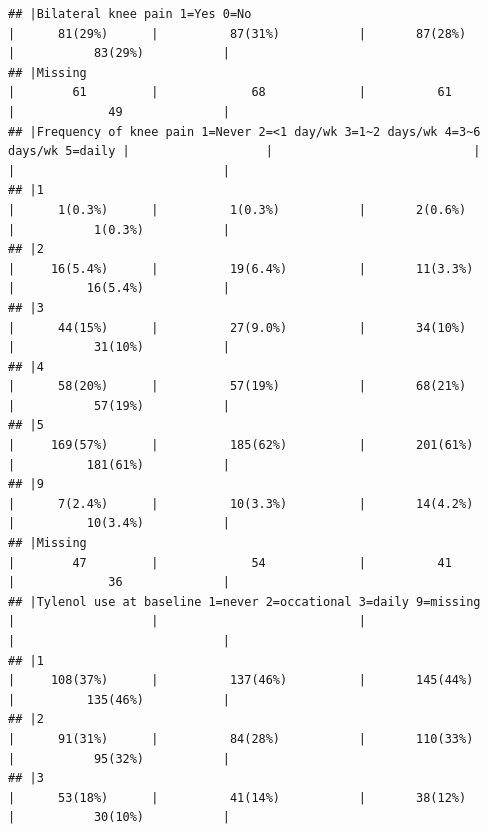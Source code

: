 \documentclass{article}
\begin{document}
\begin{verbatim}
## |Bilateral knee pain 1=Yes 0=No                                                 |      81(29%)      |          87(31%)           |       87(28%)        |           83(29%)           |
## |Missing                                                                        |        61         |             68             |          61          |             49              |
## |Frequency of knee pain 1=Never 2=<1 day/wk 3=1~2 days/wk 4=3~6 days/wk 5=daily |                   |                            |                      |                             |
## |1                                                                              |      1(0.3%)      |          1(0.3%)           |       2(0.6%)        |           1(0.3%)           |
## |2                                                                              |     16(5.4%)      |          19(6.4%)          |       11(3.3%)       |          16(5.4%)           |
## |3                                                                              |      44(15%)      |          27(9.0%)          |       34(10%)        |           31(10%)           |
## |4                                                                              |      58(20%)      |          57(19%)           |       68(21%)        |           57(19%)           |
## |5                                                                              |     169(57%)      |          185(62%)          |       201(61%)       |          181(61%)           |
## |9                                                                              |      7(2.4%)      |          10(3.3%)          |       14(4.2%)       |          10(3.4%)           |
## |Missing                                                                        |        47         |             54             |          41          |             36              |
## |Tylenol use at baseline 1=never 2=occational 3=daily 9=missing                 |                   |                            |                      |                             |
## |1                                                                              |     108(37%)      |          137(46%)          |       145(44%)       |          135(46%)           |
## |2                                                                              |      91(31%)      |          84(28%)           |       110(33%)       |           95(32%)           |
## |3                                                                              |      53(18%)      |          41(14%)           |       38(12%)        |           30(10%)           |

\end{verbatim}
\end{document}
